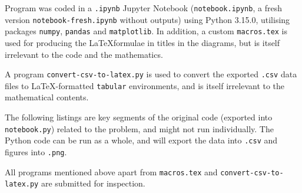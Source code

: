 \documentclass{article}
\begin{document}
Program was coded in a \verb|.ipynb| Jupyter Notebook (\verb|notebook.ipynb|, a fresh version \verb|notebook-fresh.ipynb| without outputs) using Python 3.15.0, utilising packages \verb|numpy|, \verb|pandas| and \verb|matplotlib|. In addition, a custom \verb|macros.tex| is used for producing the \LaTeX formulae in titles in the diagrams, but is itself irrelevant to the code and the mathematics.

A program \verb|convert-csv-to-latex.py| is used to convert the exported \verb|.csv| data files to \LaTeX-formatted \verb|tabular| environments, and is itself irrelevant to the mathematical contents.

The following listings are key segments of the original code (exported into \verb|notebook.py|) related to the problem, and might not run individually. The Python code can be run as a whole, and will export the data into \verb|.csv| and figures into \verb|.png|.

All programs mentioned above apart from \verb|macros.tex| and \verb|convert-csv-to-latex.py| are submitted for inspection.

\begin{listing}[htp]
    \inputminted{python}{src/notebook.py}
    \caption{Testing Python code}
    \label{lst:example}%
\end{listing}
\end{document}
